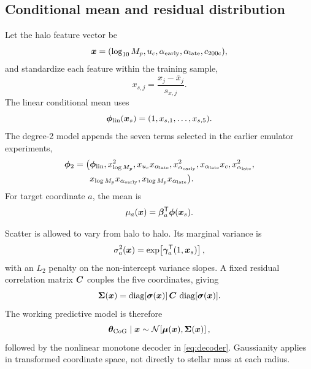 \subsection{Conditional mean and residual distribution}
\label{sec:emulator_math}

Let the halo feature vector be
\begin{equation}
  \bm{x}=(\log_{10} M_p,u_c,\alpha_{\rm early},\alpha_{\rm late},c_{200\mathrm{c}}),
\end{equation}
and standardize each feature within the training sample,
\begin{equation}
  x_{s,j}=\frac{x_j-\overline{x}_j}{s_{x,j}}.
  \label{eq:standardization}
\end{equation}
The linear conditional mean uses
\begin{equation}
  \bm{\phi}_{\rm lin}(\bm{x}_s)=(1,x_{s,1},\ldots,x_{s,5}).
\end{equation}
The degree-2 model appends the seven terms selected in the earlier emulator
experiments,
\begin{align}
  \bm{\phi}_{2} = \big(&\bm{\phi}_{\rm lin},
  x_{\log M_p}^2,
  x_{u_c}x_{\alpha_{\rm late}},
  x_{\alpha_{\rm early}}^2,
  x_{\alpha_{\rm late}}x_{c},
  x_{\alpha_{\rm late}}^2,\nonumber\\
  &x_{\log M_p}x_{\alpha_{\rm early}},
  x_{\log M_p}x_{\alpha_{\rm late}}\big).
  \label{eq:poly2_basis}
\end{align}
For target coordinate $a$, the mean is
\begin{equation}
  \mu_a(\bm{x})=\bm{\beta}_a^{\mathsf T}\bm{\phi}(\bm{x}_s).
  \label{eq:mean_model}
\end{equation}

Scatter is allowed to vary from halo to halo. Its marginal variance is
\begin{equation}
  \sigma_a^2(\bm{x})=
  \exp\!\left[\bm{\gamma}_a^{\mathsf T}(1,\bm{x}_s)\right],
  \label{eq:heteroscedastic}
\end{equation}
with an $L_2$ penalty on the non-intercept variance slopes. A fixed residual
correlation matrix $\bm{C}$ couples the five coordinates, giving
\begin{equation}
  \bm{\Sigma}(\bm{x})=
  \operatorname{diag}[\bm{\sigma}(\bm{x})]\,
  \bm{C}\,
  \operatorname{diag}[\bm{\sigma}(\bm{x})].
  \label{eq:covariance}
\end{equation}
The working predictive model is therefore
\begin{equation}
  \bm{\theta}_{\mathrm{CoG}}\mid\bm{x}
  \sim \mathcal{N}\!\left[\bm{\mu}(\bm{x}),\bm{\Sigma}(\bm{x})\right],
  \label{eq:conditional_gaussian}
\end{equation}
followed by the nonlinear monotone decoder in \cref{eq:decoder}. Gaussianity
applies in transformed coordinate space, not directly to stellar mass at each
radius.

